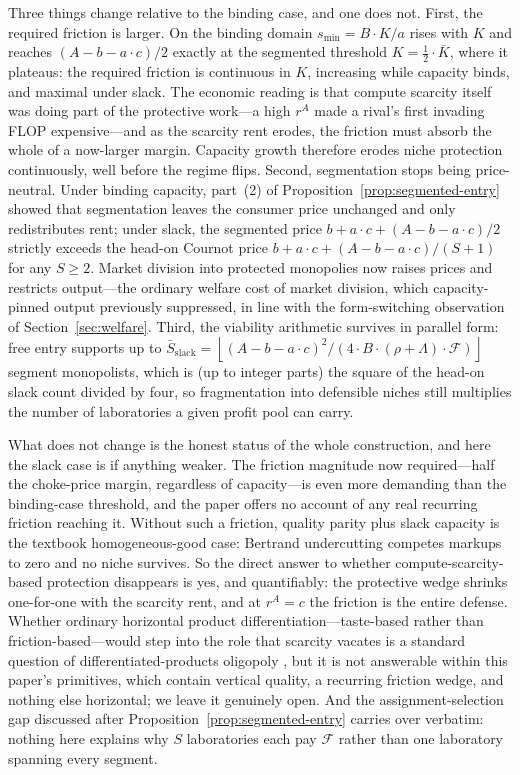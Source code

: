 \documentclass[11pt]{article}
\begin{document}
Three things change relative to the binding case, and one does not. First, the required friction is larger. On the binding domain $s_{\min}=B\cdot K/a$ rises with $K$ and reaches $(A-b-a\cdot c)/2$ exactly at the segmented threshold $K=\frac12\cdot\bar K$, where it plateaus: the required friction is continuous in $K$, increasing while capacity binds, and maximal under slack. The economic reading is that compute scarcity itself was doing part of the protective work---a high $r^{A}$ made a rival's first invading FLOP expensive---and as the scarcity rent erodes, the friction must absorb the whole of a now-larger margin. Capacity growth therefore erodes niche protection continuously, well before the regime flips. Second, segmentation stops being price-neutral. Under binding capacity, part~(2) of Proposition~\ref{prop:segmented-entry} showed that segmentation leaves the consumer price unchanged and only redistributes rent; under slack, the segmented price $b+a\cdot c+(A-b-a\cdot c)/2$ strictly exceeds the head-on Cournot price $b+a\cdot c+(A-b-a\cdot c)/(S+1)$ for any $S\geq2$. Market division into protected monopolies now raises prices and restricts output---the ordinary welfare cost of market division, which capacity-pinned output previously suppressed, in line with the form-switching observation of Section~\ref{sec:welfare}. Third, the viability arithmetic survives in parallel form: free entry supports up to $\bar S_{\mathrm{slack}}=\left\lfloor(A-b-a\cdot c)^{2}/(4\cdot B\cdot(\rho+\Lambda)\cdot\mathcal F)\right\rfloor$ segment monopolists, which is (up to integer parts) the square of the head-on slack count divided by four, so fragmentation into defensible niches still multiplies the number of laboratories a given profit pool can carry.

What does not change is the honest status of the whole construction, and here the slack case is if anything weaker. The friction magnitude now required---half the choke-price margin, regardless of capacity---is even more demanding than the binding-case threshold, and the paper offers no account of any real recurring friction reaching it. Without such a friction, quality parity plus slack capacity is the textbook homogeneous-good case: Bertrand undercutting competes markups to zero and no niche survives. So the direct answer to whether compute-scarcity-based protection disappears is yes, and quantifiably: the protective wedge shrinks one-for-one with the scarcity rent, and at $r^{A}=c$ the friction is the entire defense. Whether ordinary horizontal product differentiation---taste-based rather than friction-based---would step into the role that scarcity vacates is a standard question of differentiated-products oligopoly \citep{singhVives1984}, but it is not answerable within this paper's primitives, which contain vertical quality, a recurring friction wedge, and nothing else horizontal; we leave it genuinely open. And the assignment-selection gap discussed after Proposition~\ref{prop:segmented-entry} carries over verbatim: nothing here explains why $S$ laboratories each pay $\mathcal F$ rather than one laboratory spanning every segment.
\end{document}
